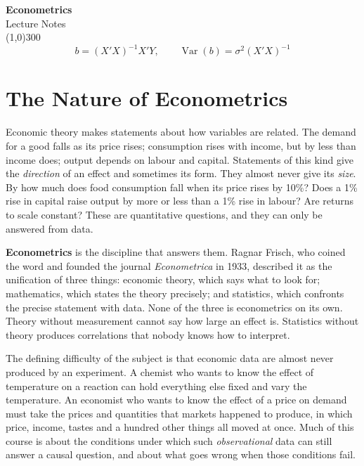 \documentclass[11pt,a4paper]{article}
\numberwithin{equation}{section}
\DeclareMathOperator{\Var}{Var}
\theoremstyle{definition}
\begin{document}
\begin{titlepage}
\thispagestyle{empty}
\begin{center}
\vspace*{3cm}
{\Huge\bfseries Econometrics}\\[1.2cm]
{\large Lecture Notes}\\[2.5cm]
\line(1,0){300}\\[1.5cm]
$$b=(X'X)^{-1}X'Y,\qquad \Var(b)=\sigma^{2}(X'X)^{-1}$$
\end{center}
\end{titlepage}

\tableofcontents
\thispagestyle{empty}
\clearpage
\setcounter{page}{1}

\section{The Nature of Econometrics}
\label{sec:intro}

Economic theory makes statements about how variables are related. The demand for a good falls as its price rises; consumption rises with
income, but by less than income does; output depends on labour and capital. Statements of this kind give the \emph{direction} of an effect and
sometimes its form. They almost never give its \emph{size}. By how much does food consumption fall when its price rises by 10\%? Does a 1\% rise
in capital raise output by more or less than a 1\% rise in labour? Are returns to scale constant? These are quantitative questions, and they
can only be answered from data.

\textbf{Econometrics} is the discipline that answers them. Ragnar Frisch, who coined the word and founded the journal \emph{Econometrica} in 1933,
described it as the unification of three things: economic theory, which says what to look for; mathematics, which states the theory precisely;
and statistics, which confronts the precise statement with data. None of the three is econometrics on its own. Theory without measurement
cannot say how large an effect is. Statistics without theory produces correlations that nobody knows how to interpret.

The defining difficulty of the subject is that economic data are almost never produced by an experiment. A chemist who wants to know the effect
of temperature on a reaction can hold everything else fixed and vary the temperature. An economist who wants to know the effect of a price on
demand must take the prices and quantities that markets happened to produce, in which price, income, tastes and a hundred other things all moved
at once. Much of this course is about the conditions under which such \emph{observational} data can still answer a causal question, and about
what goes wrong when those conditions fail.
\end{document}
